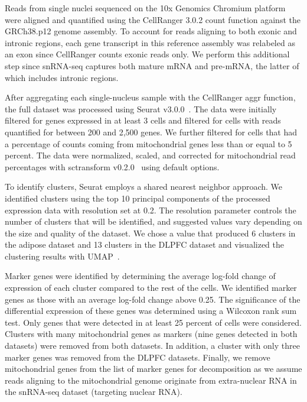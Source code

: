 Reads from single nuclei sequenced on the 10x Genomics Chromium platform were aligned and quantified using the CellRanger 3.0.2 count function against the GRCh38.p12 genome assembly. To account for reads aligning to both exonic and intronic regions, each gene transcript in this reference assembly was relabeled as an exon since CellRanger counts exonic reads only. We perform this additional step since snRNA-seq captures both mature mRNA and pre-mRNA, the latter of which includes intronic regions. 

After aggregating each single-nucleus sample with the CellRanger aggr function, the full dataset was processed using Seurat v3.0.0~\cite{Butler2018-mj}. The data were initially filtered for genes expressed in at least 3 cells and filtered for cells with reads quantified for between 200 and 2,500 genes. We further filtered for cells that had a percentage of counts coming from mitochondrial genes less than or equal to 5 percent. The data were normalized, scaled, and corrected for mitochondrial read percentages with sctransform v0.2.0~\cite{Hafemeister_undated-xh} using default options.

To identify clusters, Seurat employs a shared nearest neighbor approach. We identified clusters using the top 10 principal components of the processed expression data with resolution set at 0.2. The resolution parameter controls the number of clusters that will be identified, and suggested values vary depending on the size and quality of the dataset. We chose a value that produced 6 clusters in the adipose dataset and 13 clusters in the DLPFC dataset and visualized the clustering results with UMAP~\cite{McInnes2018-lp}. 

Marker genes were identified by determining the average log-fold change of expression of each cluster compared to the rest of the cells. We identified marker genes as those with an average log-fold change above 0.25. The significance of the differential expression of these genes was determined using a Wilcoxon rank sum test. Only genes that were detected in at least 25 percent of cells were considered. Clusters with many mitochondrial genes as markers (nine genes detected in both datasets) were removed from both datasets. In addition, a cluster with only three marker genes was removed from the DLPFC datasets. Finally, we remove mitochondrial genes from the list of marker genes for decomposition as we assume reads aligning to the mitochondrial genome originate from extra-nuclear RNA in the snRNA-seq dataset (targeting nuclear RNA). 

